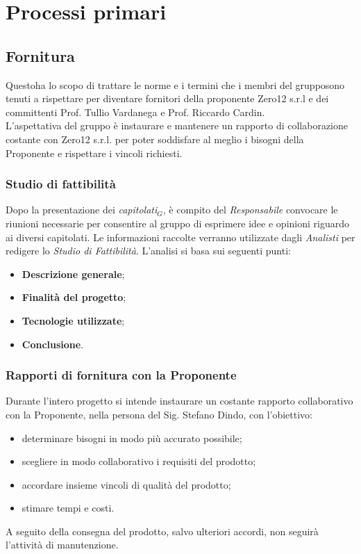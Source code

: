 \chapter{Processi primari}\label{Pp}
\section{Fornitura}			
Questoha lo scopo di trattare le norme e i termini che i membri del grupposono tenuti a rispettare per diventare fornitori della proponente Zero12 s.r.l e dei committenti Prof. Tullio Vardanega e Prof. Riccardo Cardin. \\
L'aspettativa del gruppo è instaurare e mantenere un rapporto di collaborazione costante con Zero12 s.r.l. per poter soddisfare al meglio i bisogni della Proponente e rispettare i vincoli richiesti.
\subsection{Studio di fattibilità} 
Dopo la presentazione dei \textit{capitolati$_{G}$}, è compito del \textit{Responsabile} convocare le riunioni necessarie per consentire al gruppo di esprimere idee e opinioni riguardo ai diversi capitolati. Le informazioni raccolte verranno utilizzate dagli \textit{Analisti} per redigere lo \textit{Studio di Fattibilità}. L'analisi si basa sui seguenti punti:
\begin{itemize}
	\item \textbf{Descrizione generale};
	\item \textbf{Finalità del progetto};
	\item \textbf{Tecnologie utilizzate};
	\item \textbf{Conclusione}.
\end{itemize}
\subsection{Rapporti di fornitura con la Proponente}
Durante l'intero progetto si intende instaurare un costante rapporto collaborativo con la Proponente, nella persona del Sig. Stefano Dindo, con l'obiettivo:
\begin{itemize}
	\item determinare bisogni in modo più accurato possibile;
	\item scegliere in modo collaborativo i requisiti del prodotto;
	\item accordare insieme vincoli di qualità del prodotto;
	\item stimare tempi e costi.
\end{itemize}
A seguito della consegna del prodotto, salvo ulteriori accordi, non seguirà l'attività di manutenzione.
